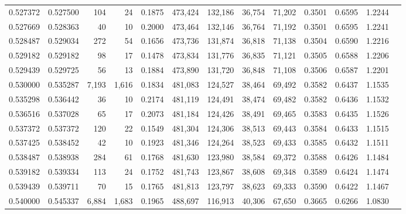 \begin{tabular}{rrrrrrrrrrrrr}
0.527372 & 0.527500 &    104 &    24 &                                     0.1875 & 473,424 & 132,186 &  36,754 &  71,202 & 0.3501 & 0.6595 & 1.2244 \\
0.527669 & 0.528363 &     40 &    10 &                                     0.2000 & 473,464 & 132,146 &  36,764 &  71,192 & 0.3501 & 0.6595 & 1.2241 \\
0.528487 & 0.529034 &    272 &    54 &                                     0.1656 & 473,736 & 131,874 &  36,818 &  71,138 & 0.3504 & 0.6590 & 1.2216 \\
0.529182 & 0.529182 &     98 &    17 &                                     0.1478 & 473,834 & 131,776 &  36,835 &  71,121 & 0.3505 & 0.6588 & 1.2206 \\
0.529439 & 0.529725 &     56 &    13 &                                     0.1884 & 473,890 & 131,720 &  36,848 &  71,108 & 0.3506 & 0.6587 & 1.2201 \\
0.530000 & 0.535287 &  7,193 & 1,616 &                                     0.1834 & 481,083 & 124,527 &  38,464 &  69,492 & 0.3582 & 0.6437 & 1.1535 \\
0.535298 & 0.536442 &     36 &    10 &                                     0.2174 & 481,119 & 124,491 &  38,474 &  69,482 & 0.3582 & 0.6436 & 1.1532 \\
0.536516 & 0.537028 &     65 &    17 &                                     0.2073 & 481,184 & 124,426 &  38,491 &  69,465 & 0.3583 & 0.6435 & 1.1526 \\
0.537372 & 0.537372 &    120 &    22 &                                     0.1549 & 481,304 & 124,306 &  38,513 &  69,443 & 0.3584 & 0.6433 & 1.1515 \\
0.537425 & 0.538452 &     42 &    10 &                                     0.1923 & 481,346 & 124,264 &  38,523 &  69,433 & 0.3585 & 0.6432 & 1.1511 \\
0.538487 & 0.538938 &    284 &    61 &                                     0.1768 & 481,630 & 123,980 &  38,584 &  69,372 & 0.3588 & 0.6426 & 1.1484 \\
0.539182 & 0.539334 &    113 &    24 &                                     0.1752 & 481,743 & 123,867 &  38,608 &  69,348 & 0.3589 & 0.6424 & 1.1474 \\
0.539439 & 0.539711 &     70 &    15 &                                     0.1765 & 481,813 & 123,797 &  38,623 &  69,333 & 0.3590 & 0.6422 & 1.1467 \\
0.540000 & 0.545337 &  6,884 & 1,683 &                                     0.1965 & 488,697 & 116,913 &  40,306 &  67,650 & 0.3665 & 0.6266 & 1.0830 \\

\end{tabular}
